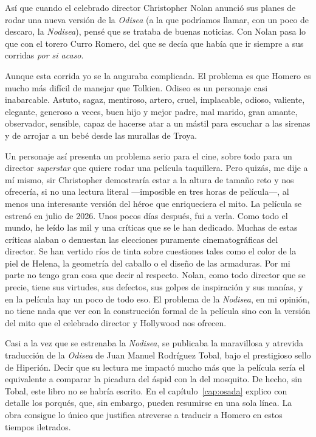 Así que cuando el celebrado director Christopher Nolan anunció sus planes de rodar una nueva versión de la
\emph{Odisea} (a la que podríamos llamar, con un poco de descaro, la \emph{Nodisea}), pensé que se trataba de buenas noticias. Con Nolan pasa lo que con el torero Curro Romero, del que se decía que había que ir siempre a sus corridas \emph{por si acaso}.

Aunque esta corrida yo se la auguraba complicada. El problema es que Homero es mucho más difícil de manejar que Tolkien. Odiseo es un personaje casi inabarcable. Astuto, sagaz, mentiroso, artero, cruel, implacable, odioso, valiente, elegante, generoso a veces, buen hijo y mejor padre, mal marido, gran amante, observador, sensible, capaz de hacerse atar a un mástil para escuchar a las sirenas y de arrojar a un bebé desde las murallas de Troya.

Un personaje así presenta un problema serio para el cine, sobre todo para un director \emph{superstar} que quiere rodar una película taquillera. Pero quizás, me dije a mí mismo, sir Christopher demostraría estar a la altura de tamaño reto y nos ofrecería, si no una lectura literal ---imposible en tres horas de película---, al menos una interesante versión del héroe que enriqueciera el mito. La película se estrenó en julio de 2026. Unos pocos días después, fui a verla. Como todo el mundo,
he leído las mil y una críticas que se le han dedicado. Muchas de estas críticas alaban o denuestan las elecciones puramente cinematográficas del director. Se han vertido ríos de tinta sobre cuestiones tales como el color de la piel de Helena, la geometría del caballo o el diseño de las armaduras. Por mi parte no tengo gran cosa que decir al respecto. Nolan, como todo director que se precie, tiene sus virtudes, sus defectos, sus golpes de inspiración y sus manías, y en la película hay un poco de todo eso. El problema de la \emph{Nodisea}, en mi opinión, no tiene nada que ver con la construcción formal de la película sino con la versión del mito que el celebrado director y Hollywood nos ofrecen.

Casi a la vez que se estrenaba la \emph{Nodisea}, se publicaba la maravillosa y atrevida traducción de la \emph{Odisea} de Juan Manuel Rodríguez Tobal, bajo el prestigioso sello de Hiperión. Decir que su lectura me impactó mucho más que la película sería el equivalente a comparar la picadura del áspid con la del mosquito. De hecho, sin Tobal, este libro no se habría escrito. En el capítulo~\ref{cap:osada} explico con detalle los porqués, que, sin embargo, pueden resumirse en una sola línea. La obra consigue lo único que justifica atreverse a traducir a Homero en estos tiempos iletrados.

